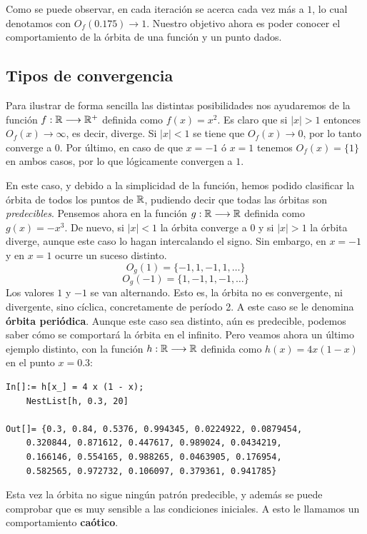Como se puede observar, en cada iteración se acerca cada vez más a $1$, lo cual denotamos con $O_f(0.175)\rightarrow 1$. Nuestro objetivo ahora es poder conocer el comportamiento de la órbita de una función y un punto dados. 

\subsection{Tipos de convergencia}

Para ilustrar de forma sencilla las distintas posibilidades nos ayudaremos de la función $f:\mathbb{R}\longrightarrow\mathbb{R}^+$ definida como $f(x)=x^2$. Es claro que si $|x|>1$ entonces $O_f(x)\rightarrow\infty$, es decir, diverge. Si $|x|<1$ se tiene que $O_f(x)\rightarrow 0$, por lo tanto converge a $0$. Por último, en caso de que $x=-1$ ó $x=1$ tenemos $O_f(x)=\{1\}$ en ambos casos, por lo que lógicamente convergen a $1$.

En este caso, y debido a la simplicidad de la función, hemos podido clasificar la órbita de todos los puntos de $\mathbb{R}$, pudiendo decir que todas las órbitas son \textit{predecibles}. Pensemos ahora en la función $g:\mathbb{R}\longrightarrow\mathbb{R}$ definida como $g(x)=-x^3$. De nuevo, si $|x|<1$ la órbita converge a 0 y si $|x|>1$ la órbita diverge, aunque este caso lo hagan intercalando el signo. Sin embargo, en $x=-1$ y en $x=1$ ocurre un suceso distinto.
$$
O_g(1) = \{-1,1,-1,1,\dots\}
$$
$$
O_g(-1) = \{1,-1,1,-1,\dots\}
$$
Los valores $1$ y $-1$ se van alternando. Esto es, la órbita no es convergente, ni divergente, sino cíclica, concretamente de período 2. A este caso se le denomina \textbf{órbita periódica}. Aunque este caso sea distinto, aún es predecible, podemos saber cómo se comportará la órbita en el infinito. Pero veamos ahora un último ejemplo distinto, con la función $h:\mathbb{R}\longrightarrow\mathbb{R}$ definida como $h(x)=4x(1-x)$ en el punto $x=0.3$:

\begin{verbatim}
In[]:= h[x_] = 4 x (1 - x);
    NestList[h, 0.3, 20]

Out[]= {0.3, 0.84, 0.5376, 0.994345, 0.0224922, 0.0879454, 
    0.320844, 0.871612, 0.447617, 0.989024, 0.0434219, 
    0.166146, 0.554165, 0.988265, 0.0463905, 0.176954, 
    0.582565, 0.972732, 0.106097, 0.379361, 0.941785}
\end{verbatim}

Esta vez la órbita no sigue ningún patrón predecible, y además se puede comprobar que es muy sensible a las condiciones iniciales. A esto le llamamos un comportamiento \textbf{caótico}.

